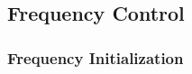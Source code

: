 


\subsection{Frequency Control}
\label{s-frequency-control}


\subsubsection{Frequency Initialization}
\label{s-frequency-initialization}

